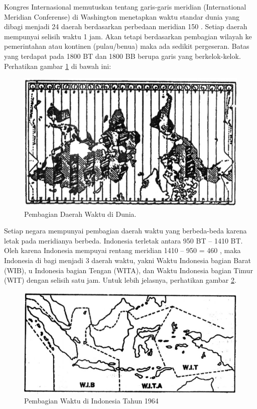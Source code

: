 {{ Kongres Internasional memutuskan tentang garis-garis meridian (International Meridian Conferense) 
 di Washington menetapkan waktu standar dunia yang dibagi menjadi 24 daerah berdasarkan
 perbedaan meridian 150 . Setiap daerah mempunyai selisih waktu 1 jam.
 Akan tetapi berdasarkan pembagian wilayah ke pemerintahan atau kontinen (pulau/benua)
 maka ada sedikit pergeseran. Batas yang terdapat pada 1800 BT dan 1800 BB berupa garis
 yang berkelok-kelok. Perhatikan gambar \ref{sejarahwaktu_Capture1} di bawah ini:
 
 \begin{figure}[ht]
 \centerline{\includegraphics[width=1\textwidth]{figures/sejarahwaktu_dunia}}
 \caption{Pembagian Daerah Waktu di Dunia.}
 \label{sejarahwaktu_Capture1}
 \end{figure}
 

 
Setiap negara mempunyai pembagian daerah waktu yang berbeda-beda karena letak pada meridianya berbeda. 
 Indonesia terletak antara 950 BT – 1410 BT. Oleh karena Indonesia mempuyai rentang meridian 1410 – 950 = 460 , 
 maka Indonesia di bagi menjadi 3 daerah waktu, yakni Waktu Indonesia bagian Barat (WIB),
 u Indonesia bagian Tengan (WITA), dan Waktu Indonesia bagian Timur (WIT) dengan selisih
 satu jam. Untuk lebih jelasnya,  perhatikan gambar \ref{sejarahwaktu_Capture2}.

 
 \begin{figure}[ht]
 \centerline{\includegraphics[width=1\textwidth]{figures/sejarahwaktu_indo64}}
 \caption{Pembagian Waktu di Indonesia Tahun 1964}
 \label{sejarahwaktu_Capture2}
 \end{figure}
 


}}
